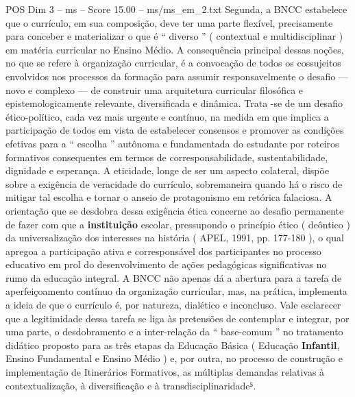 \begin{textsample}{POS Dim 3 – ms – Score 15.00 – ms/ms\_em\_2.txt}
Segunda, a BNCC estabelece que o currículo, em sua composição, deve ter uma parte flexível, precisamente para conceber e materializar o que é “ diverso ” ( contextual e multidisciplinar ) em matéria curricular no Ensino Médio.
A consequência principal dessas noções, no que se refere à organização curricular, é a convocação de todos os cossujeitos envolvidos nos processos da formação para assumir responsavelmente o desafio — novo e complexo — de construir uma arquitetura curricular filosófica e epistemologicamente relevante, diversificada e dinâmica.
Trata -se de um desafio ético-político, cada vez mais urgente e contínuo, na medida em que implica a participação de todos em vista de estabelecer consensos e promover as condições efetivas para a “ escolha ” autônoma e fundamentada do estudante por roteiros formativos consequentes em termos de corresponsabilidade, sustentabilidade, dignidade e esperança.
A eticidade, longe de ser um aspecto colateral, dispõe sobre a exigência de veracidade do currículo, sobremaneira quando há o risco de mitigar tal escolha e tornar o anseio de protagonismo em retórica falaciosa.
A orientação que se desdobra dessa exigência ética concerne ao desafio permanente de fazer com que a \textbf{instituição} escolar, pressupondo o princípio ético ( deôntico ) da universalização dos interesses na história ( APEL, 1991, pp. 177-180 ), o qual apregoa a participação ativa e corresponsável dos participantes no processo educativo em prol do desenvolvimento de ações pedagógicas significativas no rumo da educação integral.
A BNCC não apenas dá a abertura para a tarefa de aperfeiçoamento contínuo da organização curricular, mas, na prática, implementa a ideia de que o currículo é, por natureza, dialético e inconcluso.
Vale esclarecer que a legitimidade dessa tarefa se liga às pretensões de contemplar e integrar, por uma parte, o desdobramento e a inter-relação da “ base-comum ” no tratamento didático proposto para as três etapas da Educação Básica ( Educação \textbf{Infantil}, Ensino Fundamental e Ensino Médio ) e, por outra, no processo de construção e implementação de Itinerários Formativos, as múltiplas demandas relativas à contextualização, à diversificação e à transdisciplinaridade⁵.

\end{textsample}
